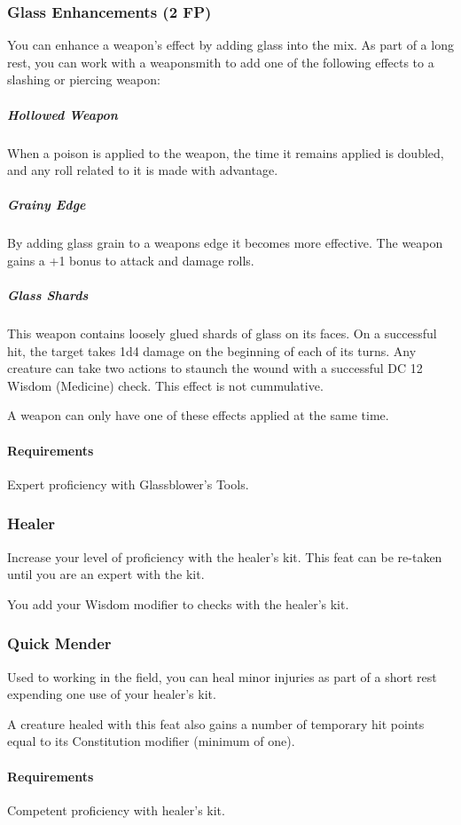 \subsubsection{Glass Enhancements (2 FP)} \label{feat::glassenhancement}
    You can enhance a weapon's effect by adding glass into the mix.
    As part of a long rest, you can work with a weaponsmith to add one of the following effects to a slashing or piercing weapon:
    \subparagraph{Hollowed Weapon} When a poison is applied to the weapon, the time it remains applied is doubled, and any roll related to it is made with advantage.
    \subparagraph{Grainy Edge} By adding glass grain to a weapons edge it becomes more effective.
    The weapon gains a +1 bonus to attack and damage rolls.
    \subparagraph{Glass Shards} This weapon contains loosely glued shards of glass on its faces.
    On a successful hit, the target takes 1d4 damage on the beginning of each of its turns.
    Any creature can take two actions to staunch the wound with a successful DC 12 Wisdom (Medicine) check.
    This effect is not cummulative.

    A weapon can only have one of these effects applied at the same time.
    \paragraph{Requirements} Expert proficiency with Glassblower's Tools.

\subsubsection{Healer} \label{feat::healer}
    Increase your level of proficiency with the healer's kit.
    This feat can be re-taken until you are an expert with the kit.

    You add your Wisdom modifier to checks with the healer's kit.
\subsubsection{Quick Mender} \label{feat::quickmender}
    Used to working in the field, you can heal minor injuries as part of a short rest expending one use of your healer's kit.

    A creature healed with this feat also gains a number of temporary hit points equal to its Constitution modifier (minimum of one).
    \paragraph{Requirements} Competent proficiency with healer's kit.
